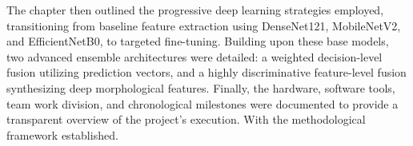 The chapter then outlined the progressive deep learning strategies employed, transitioning from baseline feature extraction using DenseNet121, MobileNetV2, and EfficientNetB0, to targeted fine-tuning. Building upon these base models, two advanced ensemble architectures were detailed: a weighted decision-level fusion utilizing prediction vectors, and a highly discriminative feature-level fusion synthesizing deep morphological features. Finally, the hardware, software tools, team work division, and chronological milestones were documented to provide a transparent overview of the project's execution. With the methodological framework established.